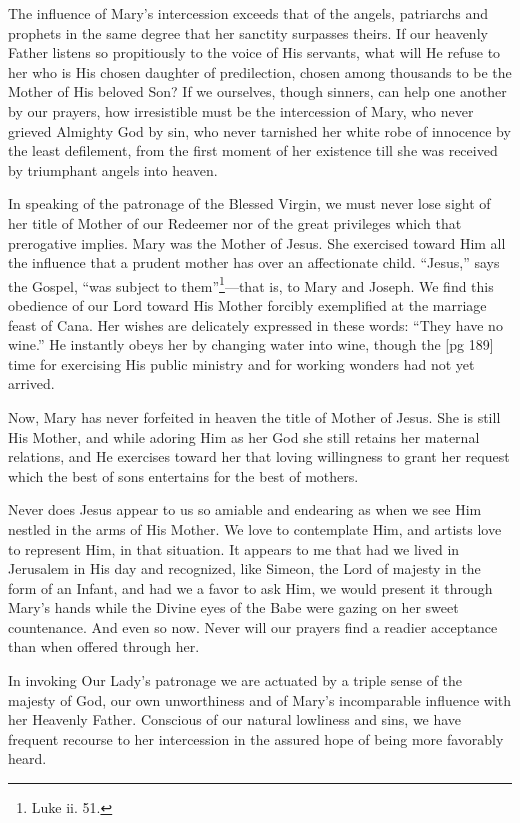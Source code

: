 The influence of Mary's intercession exceeds
that of the angels, patriarchs and prophets in the
same degree that her sanctity surpasses theirs.
If our heavenly Father listens so propitiously to
the voice of His servants, what will He refuse to
her who is His chosen daughter of predilection,
chosen among thousands to be the Mother of His
beloved Son? If we ourselves, though sinners,
can help one another by our prayers, how irresistible
must be the intercession of Mary, who
never grieved Almighty God by sin, who never
tarnished her white robe of innocence by the least
defilement, from the first moment of her existence
till she was received by triumphant angels
into heaven.

In speaking of the patronage of the Blessed Virgin,
we must never lose sight of her title of Mother
of our Redeemer nor of the great privileges which
that prerogative implies. Mary was the Mother
of Jesus. She exercised toward Him all the influence
that a prudent mother has over an affectionate
child. “Jesus,” says the Gospel, “was
subject to them”\footnote{Luke
ii. 51.}—that is, to Mary and Joseph.
We find this obedience of our Lord toward His
Mother forcibly exemplified at the marriage feast
of Cana. Her wishes are delicately expressed in
these words: “They have no wine.” He instantly
obeys her by changing water into wine, though the
[pg 189]
time for exercising His public ministry and for
working wonders had not yet arrived.

Now, Mary has never forfeited in heaven the
title of Mother of Jesus. She is still His Mother,
and while adoring Him as her God she still retains
her maternal relations, and He exercises toward
her that loving willingness to grant her request
which the best of sons entertains for the
best of mothers.

Never does Jesus appear to us so amiable and
endearing as when we see Him nestled in the arms
of His Mother. We love to contemplate Him, and
artists love to represent Him, in that situation.
It appears to me that had we lived in Jerusalem
in His day and recognized, like Simeon, the Lord
of majesty in the form of an Infant, and had we
a favor to ask Him, we would present it through
Mary's hands while the Divine eyes of the Babe
were gazing on her sweet countenance. And even
so now. Never will our prayers find a readier
acceptance than when offered through her.

In invoking Our Lady's patronage we are actuated
by a triple sense of the majesty of God, our
own unworthiness and of Mary's incomparable
influence with her Heavenly Father. Conscious
of our natural lowliness and sins, we have frequent
recourse to her intercession in the assured
hope of being more favorably heard.

